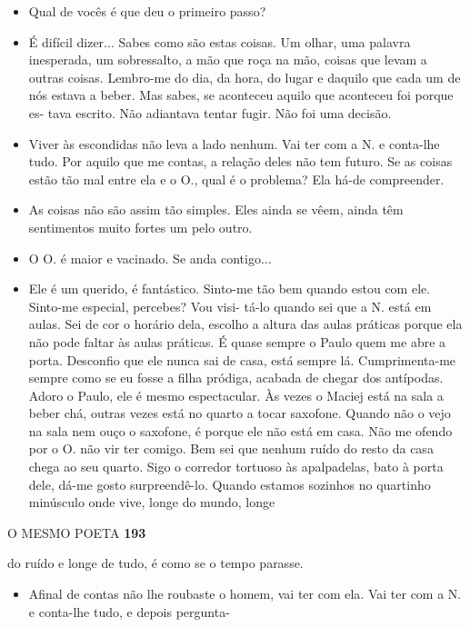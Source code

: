 \begin{itemize}
\tightlist
\item
  Qual de vocês é que deu o primeiro passo?
\item
  É difícil dizer... Sabes como são estas coisas. Um olhar, uma palavra
  inesperada, um sobressalto, a mão que roça na mão, coisas que levam a
  outras coisas. Lembro-me do dia, da hora, do lugar e daquilo que cada
  um de nós estava a beber. Mas sabes, se aconteceu aquilo que aconteceu
  foi porque es- tava escrito. Não adiantava tentar fugir. Não foi uma
  decisão.
\item
  Viver às escondidas não leva a lado nenhum. Vai ter com a N. e
  conta-lhe tudo. Por aquilo que me contas, a relação deles não tem
  futuro. Se as coisas estão tão mal entre ela e o O., qual é o
  problema? Ela há-de compreender.
\item
  As coisas não são assim tão simples. Eles ainda se vêem, ainda têm
  sentimentos muito fortes um pelo outro.
\item
  O O. é maior e vacinado. Se anda contigo...
\item
  Ele é um querido, é fantástico. Sinto-me tão bem quando estou com ele.
  Sinto-me especial, percebes? Vou visi- tá-lo quando sei que a N. está
  em aulas. Sei de cor o horário dela, escolho a altura das aulas
  práticas porque ela não pode faltar às aulas práticas. É quase sempre
  o Paulo quem me abre a porta. Desconfio que ele nunca sai de casa,
  está sempre lá. Cumprimenta-me sempre como se eu fosse a filha
  pródiga, acabada de chegar dos antípodas. Adoro o Paulo, ele é mesmo
  espectacular. Às vezes o Maciej está na sala a beber chá, outras vezes
  está no quarto a tocar saxofone. Quando não o vejo na sala nem ouço o
  saxofone, é porque ele não está em casa. Não me ofendo por o O. não
  vir ter comigo. Bem sei que nenhum ruído do resto da casa chega ao seu
  quarto. Sigo o corredor tortuoso às apalpadelas, bato à porta dele,
  dá-me gosto surpreendê-lo. Quando estamos sozinhos no quartinho
  minúsculo onde vive, longe do mundo, longe
\end{itemize}

O MESMO POETA \textbf{193}

do ruído e longe de tudo, é como se o tempo parasse.

\begin{itemize}
\tightlist
\item
  Afinal de contas não lhe roubaste o homem, vai ter com ela. Vai ter
  com a N. e conta-lhe tudo, e depois pergunta-
\end{itemize}

